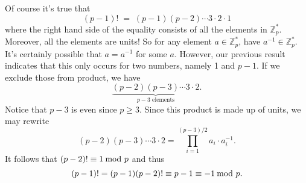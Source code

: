 \documentclass[../hw_sols.tex]{subfiles}
\begin{document}
\begin{description}
\begin{solution}
Of course it's true that
	$$(p-1)! \; = \; (p-1)(p-2) \cdots 3 \cdot 2 \cdot 1$$
where the right hand side of the equality consists of all the elements in 
$\mathbb{Z}_p^*$. Moreover, all the elements are units! So for any element 
$a \in \mathbb{Z}_p^*$, have $a^{-1} \in \mathbb{Z}_p^*$. It's certainly 
possible that $a = a^{-1}$ for some $a$. However, our previous result 
indicates that this only occurs for two numbers, namely 1 and $p-1$. If we 
exclude those from product, we have
	$$\underbrace{(p-2)(p-3) \cdots 3 \cdot 2}_{p-3 \text{ elements}}.$$
Notice that $p-3$ is even since $p \geq 3$. Since this product is made up of 
units, we may rewrite
	$$(p-2)(p-3) \cdots 3 \cdot 2 
	= \prod_{i=1}^{(p-3)/2} a_i \cdot a_i^{-1}.$$
It follows that $(p-2)! \equiv 1 \tmod{p}$ and thus
	$$(p-1)! = (p-1)(p-2)! \equiv p-1 \equiv -1 \tmod{p}.$$
\end{solution}

\end{description}
\end{document}
